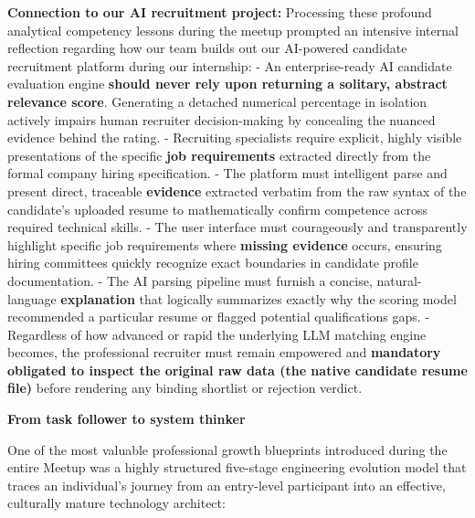 \textbf{Connection to our AI recruitment project:} Processing these
profound analytical competency lessons during the meetup prompted an
intensive internal reflection regarding how our team builds out our
AI-powered candidate recruitment platform during our internship: - An
enterprise-ready AI candidate evaluation engine \textbf{should never
rely upon returning a solitary, abstract relevance score}. Generating a
detached numerical percentage in isolation actively impairs human
recruiter decision-making by concealing the nuanced evidence behind the
rating. - Recruiting specialists require explicit, highly visible
presentations of the specific \textbf{job requirements} extracted
directly from the formal company hiring specification. - The platform
must intelligent parse and present direct, traceable \textbf{evidence}
extracted verbatim from the raw syntax of the candidate's uploaded
resume to mathematically confirm competence across required technical
skills. - The user interface must courageously and transparently
highlight specific job requirements where \textbf{missing evidence}
occurs, ensuring hiring committees quickly recognize exact boundaries in
candidate profile documentation. - The AI parsing pipeline must furnish
a concise, natural-language \textbf{explanation} that logically
summarizes exactly why the scoring model recommended a particular resume
or flagged potential qualifications gaps. - Regardless of how advanced
or rapid the underlying LLM matching engine becomes, the professional
recruiter must remain empowered and \textbf{mandatory obligated to
inspect the original raw data (the native candidate resume file)} before
rendering any binding shortlist or rejection verdict.

\vspace{0.5em}\noindent\textbf{From task follower to system
thinker}\par

One of the most valuable professional growth blueprints introduced
during the entire Meetup was a highly structured five-stage engineering
evolution model that traces an individual's journey from an entry-level
participant into an effective, culturally mature technology architect:

